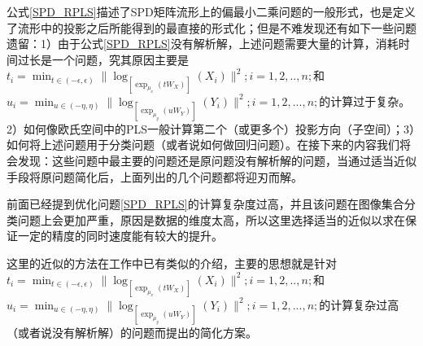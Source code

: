 公式\ref{SPD_RPLS}描述了SPD矩阵流形上的偏最小二乘问题的一般形式，也是定义了流形中的投影之后所能得到的最直接的形式化；但是不难发现还有如下一些问题遗留：1）由于公式\ref{SPD_RPLS}没有解析解，上述问题需要大量的计算，消耗时间过长是一个问题，究其原因主要是$t_i=\min_{t \in (-\epsilon,\epsilon)}\|\log_{[\exp_{\mu_x}(tW_X)]}(X_i)\|^2;i=1,2,..,n;$和$u_i=\min_{u \in (-\eta,\eta)}\|\log_{[\exp_{\mu_y}(uW_Y)]}(Y_i)\|^2;i=1,2,...,n;$的计算过于复杂。2）如何像欧氏空间中的PLS一般计算第二个（或更多个）投影方向（子空间）；3）如何将上述问题用于分类问题（或者说如何做回归问题）。在接下来的内容我们将会发现：这些问题中最主要的问题还是原问题没有解析解的问题，当通过适当近似手段将原问题简化后，上面列出的几个问题都将迎刃而解。

前面已经提到优化问题\ref{SPD_RPLS}的计算复杂度过高，并且该问题在图像集合分类问题上会更加严重，原因是数据的维度太高，所以这里选择适当的近似以求在保证一定的精度的同时速度能有较大的提升。

这里的近似的方法在工作\cite{RCCA,PGA}中已有类似的介绍，主要的思想就是针对$t_i=\min_{t \in (-\epsilon,\epsilon)}\|\log_{[\exp_{\mu_x}(tW_X)]}(X_i)\|^2;i=1,2,..,n;$和$u_i=\min_{u \in (-\eta,\eta)}\|\log_{[\exp_{\mu_y}(uW_Y)]}(Y_i)\|^2;i=1,2,...,n;$的计算复杂过高（或者说没有解析解）的问题而提出的简化方案。

